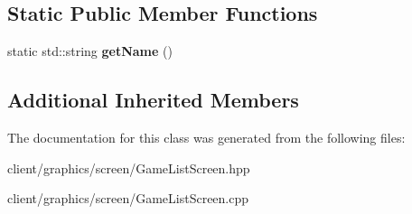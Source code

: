 \subsection*{Static Public Member Functions}
\begin{DoxyCompactItemize}
\item 
\hypertarget{classgraphics_1_1_game_list_screen_a99a8d79756c4f72e5831f38cbbac57ed}{static std\-::string {\bfseries get\-Name} ()}\label{classgraphics_1_1_game_list_screen_a99a8d79756c4f72e5831f38cbbac57ed}

\end{DoxyCompactItemize}
\subsection*{Additional Inherited Members}


The documentation for this class was generated from the following files\-:\begin{DoxyCompactItemize}
\item 
client/graphics/screen/Game\-List\-Screen.\-hpp\item 
client/graphics/screen/Game\-List\-Screen.\-cpp\end{DoxyCompactItemize}
